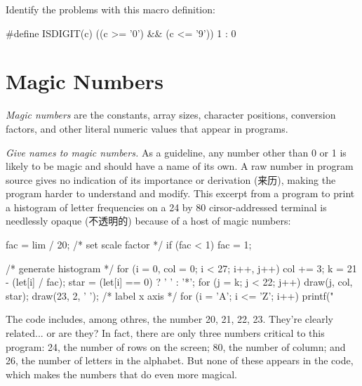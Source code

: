 \begin{exercise}
    Identify the problems with this macro definition:
    \begin{badcode}
        #define ISDIGIT(c) ((c >= '0') && (c <= '9')) 1 : 0
    \end{badcode}
\end{exercise}

\section{Magic Numbers}
\label{sec:magic_number}
\textit{Magic numbers} are the constants, array sizes, character positions,
conversion factors, and other literal numeric values that appear in programs.

\emph{Give names to magic numbers.} As a guideline, any number other than 0
or 1 is likely to be magic and should have a name of its own. A raw number
in program source gives no indication of its importance or
derivation (来历), making the program harder to understand and modify. This
excerpt from a program to print a histogram of letter frequencies on a 24
by 80 cirsor-addressed terminal is needlessly opaque (不透明的) because of a
host of magic numbers:
\begin{badcode}
    fac = lim / 20;     /* set scale factor */
    if (fac < 1)
        fac = 1;

                        /* generate histogram */
    for (i = 0, col = 0; i < 27; i++, j++) {
        col += 3;
        k = 21 - (let[i] / fac);
        star = (let[i] == 0) ? ' ' : '*';
        for (j = k; j < 22; j++)
            draw(j, col, star);
    }
    draw(23, 2, ' '); /* label x axis */
    for (i = 'A'; i <= 'Z'; i++)
        printf("%
\end{badcode}
The code includes, among othres, the number 20, 21, 22, 23. They're clearly
related... or are they? In fact, there are only three numbers critical to
this program: 24, the number of rows on the screen; 80, the number of
column; and 26, the number of letters in the alphabet. But none of these
appears in the code, which makes the numbers that do even more magical.

